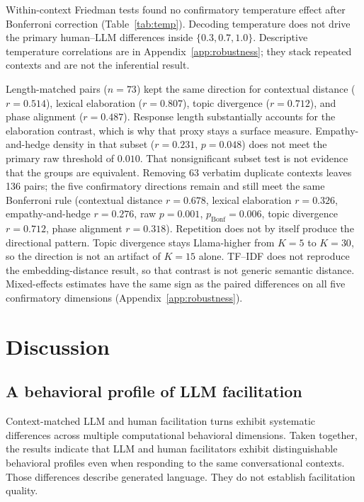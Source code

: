 \documentclass[10pt,journal,compsoc]{IEEEtran}
\begin{document}
Within-context Friedman tests found no confirmatory temperature effect after Bonferroni correction (Table~\ref{tab:temp}). Decoding temperature does not drive the primary human--LLM differences inside $\{0.3, 0.7, 1.0\}$. Descriptive temperature correlations are in Appendix~\ref{app:robustness}; they stack repeated contexts and are not the inferential result.

Length-matched pairs ($n = 73$) kept the same direction for contextual distance ($r = 0.514$), lexical elaboration ($r = 0.807$), topic divergence ($r = 0.712$), and phase alignment ($r = 0.487$). Response length substantially accounts for the elaboration contrast, which is why that proxy stays a surface measure. Empathy-and-hedge density in that subset ($r = 0.231$, $p = 0.048$) does not meet the primary raw threshold of $0.010$. That nonsignificant subset test is not evidence that the groups are equivalent. Removing 63 verbatim duplicate contexts leaves 136 pairs; the five confirmatory directions remain and still meet the same Bonferroni rule (contextual distance $r = 0.678$, lexical elaboration $r = 0.326$, empathy-and-hedge $r = 0.276$, raw $p = 0.001$, $p_\text{Bonf} = 0.006$, topic divergence $r = 0.712$, phase alignment $r = 0.318$). Repetition does not by itself produce the directional pattern. Topic divergence stays Llama-higher from $K = 5$ to $K = 30$, so the direction is not an artifact of $K = 15$ alone. TF--IDF does not reproduce the embedding-distance result, so that contrast is not generic semantic distance. Mixed-effects estimates have the same sign as the paired differences on all five confirmatory dimensions (Appendix~\ref{app:robustness}).

\section{Discussion}\label{sec:discussion}
\subsection{A behavioral profile of LLM facilitation}
Context-matched LLM and human facilitation turns exhibit systematic differences across multiple computational behavioral dimensions. Taken together, the results indicate that LLM and human facilitators exhibit distinguishable behavioral profiles even when responding to the same conversational contexts. Those differences describe generated language. They do not establish facilitation quality.
\end{document}
